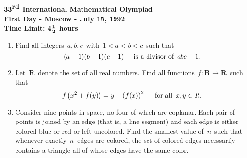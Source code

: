 \setlength{\baselineskip}{0.25in}
\setlength{\leftmargin}{0.0in}
\setlength{\textwidth}{6.5in}
\setlength{\topmargin}{0.0in}
\setlength{\textheight}{9in}
\setlength{\headheight}{0.0in}
\setlength{\headsep}{0.0in}
\setlength{\oddsidemargin}{0.0in}

\def\RR{{\mathbf{R}}}
\newenvironment{List}{%
    \begin{list}{}{\setlength{\labelwidth}{.15in}
    \setlength{\leftmargin}{.55in}
    \setlength{\rightmargin}{.25in}
    \setlength{\topsep}{0pt}
    \setlength{\partopsep}{0pt} 
    }}{\end{list}}



\begin{center}
${\bf 33}^{\mbox{\bf rd}}$
{\bf International Mathematical Olympiad} \\[.1in]
{\bf First Day - Moscow - July 15, 1992} \\
{\bf Time Limit: 4}${{\bf 1}\over{\bf 2}}$ {\bf 
hours} 
\end{center}
\begin{enumerate}
\item
Find all integers $\, a,b,c \,$ with $\, 1 < a < b < c \,$ such
that 
\[
(a-1)(b-1)(c-1) \hspace{.2in} \mbox{is a divisor of $\, abc - 1$.}
\]
\item
Let $\, \RR \,$ denote the set of all real numbers.  Find all
functions $\, f: \RR \rightarrow \RR \,$ such that
\[
f \left( x^2 + f(y) \right) = y + \left( f(x) \right)^2
\hspace{.2in} \mbox{for all $\, x,y \in R$.}
\]
\item
Consider nine points in space, no four of which are coplanar. 
Each
pair of points is joined by an edge (that is, a line segment)
and each edge is either colored blue or red or left uncolored.
Find the smallest value of $\, n \,$ such that whenever exactly
$\, n \,$ edges are colored, the set of colored edges necessarily
contains a triangle all of whose edges have the same color.
\end{enumerate}

